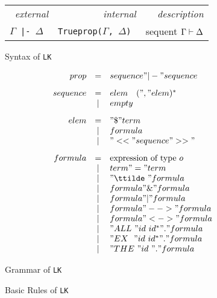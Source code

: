 \begin{figure}
\begin{center}
\begin{tabular}{rrr} 
  \it external          & \it internal  & \it description \\ 
  \tt $\Gamma$ |- $\Delta$  &  \tt Trueprop($\Gamma$, $\Delta$) &
        sequent $\Gamma\vdash \Delta$ 
\end{tabular}
\end{center}
\caption{Syntax of {\tt LK}} \label{lk-syntax}
\end{figure}


\begin{figure} 
\dquotes
\[\begin{array}{rcl}
    prop & = & sequence " |- " sequence 
\\[2ex]
sequence & = & elem \quad (", " elem)^* \\
         & | & empty 
\\[2ex]
    elem & = & "\$ " term \\
         & | & formula  \\
         & | & "<<" sequence ">>" 
\\[2ex]
 formula & = & \hbox{expression of type~$o$} \\
         & | & term " = " term \\
         & | & "\ttilde\ " formula \\
         & | & formula " \& " formula \\
         & | & formula " | " formula \\
         & | & formula " --> " formula \\
         & | & formula " <-> " formula \\
         & | & "ALL~" id~id^* " . " formula \\
         & | & "EX~~" id~id^* " . " formula \\
         & | & "THE~" id~     " . " formula
  \end{array}
\]
\caption{Grammar of {\tt LK}} \label{lk-grammar}
\end{figure}




\begin{figure} 

\caption{Basic Rules of {\tt LK}}  \label{lk-basic-rules}
\end{figure}

